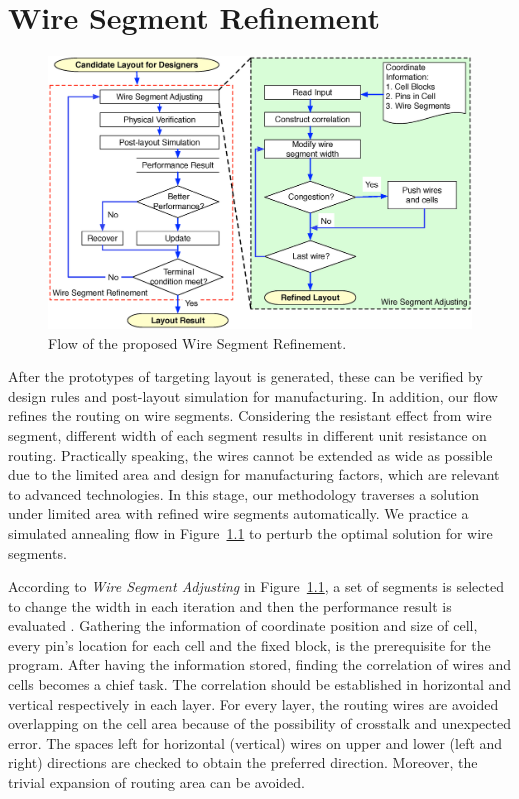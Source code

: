 \chapter{Wire Segment Refinement}\label{chap:WireSegRefine}

  \begin{figure}[t]
    \centering
    \includegraphics[width=\textwidth]{Fig/wireSegRefine.eps}
    \caption{Flow of the proposed Wire Segment Refinement.}
    \label{fig:WireSegRefine}
  \end{figure}
  
    


  After the prototypes of targeting layout is generated, these can be verified by design rules and post-layout simulation for manufacturing. In addition, our flow refines the routing on wire segments. Considering the resistant effect from wire segment, different width of each segment results in different unit resistance on routing. Practically speaking, the wires cannot be extended as wide as possible due to the limited area and design for manufacturing factors, which are relevant to advanced technologies. In this stage, our methodology traverses a solution under limited area with refined wire segments automatically. We practice a simulated annealing flow in Figure~\ref{fig:WireSegRefine} to perturb the optimal solution for wire segments.

  
  

  According to {\it Wire Segment Adjusting} in Figure~\ref{fig:WireSegRefine}, a set of segments is selected to change the width in each iteration and then the performance result is evaluated . Gathering the information of coordinate position and size of cell, every pin's location for each cell and the fixed block, is the prerequisite for the program. After having the information stored, finding the correlation of wires and cells becomes a chief task. The correlation should be established in horizontal and vertical respectively in each layer. For every layer, the routing wires are avoided overlapping on the cell area because of the possibility of crosstalk and unexpected error. The spaces left for horizontal (vertical) wires on upper and lower (left and right) directions are checked to obtain the preferred direction. Moreover, the trivial expansion of routing area can be avoided. 

